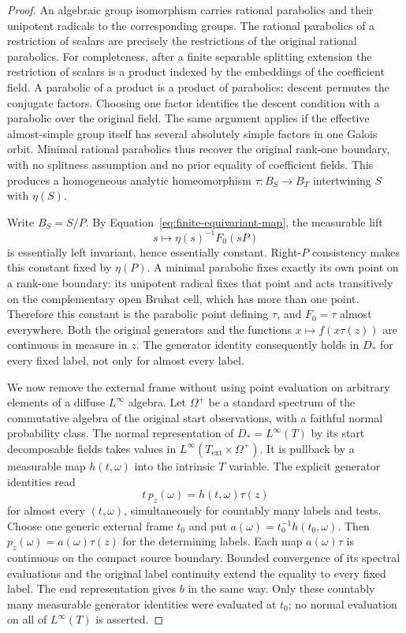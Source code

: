\begin{proof}
An algebraic group isomorphism carries rational parabolics and
their unipotent radicals to the corresponding groups.
The rational parabolics of a restriction of scalars are precisely
the restrictions of the original rational parabolics.
For completeness, after a finite separable splitting extension
the restriction of scalars is a product indexed by the
embeddings of the coefficient field.  A parabolic of a product
is a product of parabolics; descent permutes the conjugate
factors.  Choosing one factor identifies the descent condition
with a parabolic over the original field.  The same argument
applies if the effective almost-simple group itself has several
absolutely simple factors in one Galois orbit.  Minimal rational
parabolics thus recover the original rank-one boundary, with
no splitness assumption and no prior equality of coefficient
fields.  This produces a homogeneous analytic homeomorphism
$\tau:B_S\to B_T$ intertwining $S$ with $\eta(S)$.

Write $B_S=S/P$.  By
Equation~\eqref{eq:finite-equivariant-map}, the measurable lift
\[
 s\longmapsto\eta(s)^{-1}F_0(sP)
\]
is essentially left invariant, hence essentially constant.
Right-$P$ consistency makes this constant fixed by $\eta(P)$.
A minimal parabolic fixes exactly its own point on a rank-one
boundary: its unipotent radical fixes that point and acts
transitively on the complementary open Bruhat cell, which has
more than one point.  Therefore this constant is the parabolic
point defining $\tau$, and $F_0=\tau$ almost everywhere.
Both the original generators and the functions
$x\mapsto f(x\tau(z))$ are continuous in measure in $z$.
The generator identity consequently holds in $D_*$ for every
fixed label, not only for almost every label.

We now remove the external frame without using point evaluation
on arbitrary elements of a diffuse $L^\infty$ algebra.
Let $\Omega^+$ be a standard spectrum of the commutative algebra
of the original start observations, with a faithful normal
probability class.  The normal representation of
$D_*=L^\infty(T)$ by its start decomposable fields takes values
in $L^\infty(T_{\mathrm{ext}}\times\Omega^+)$.
It is pullback by a measurable map $h(t,\omega)$ into the
intrinsic $T$ variable.  The explicit generator identities read
\[
 t\,p_z(\omega)=h(t,\omega)\tau(z)
\]
for almost every $(t,\omega)$, simultaneously for countably
many labels and tests.  Choose one generic external frame $t_0$
and put $a(\omega)=t_0^{-1}h(t_0,\omega)$.
Then $p_z(\omega)=a(\omega)\tau(z)$ for the determining labels.
Each map $a(\omega)\tau$ is continuous on the compact source
boundary.  Bounded convergence of its spectral evaluations and
the original label continuity extend the equality to every
fixed label.  The end representation gives $b$ in the same way.
Only these countably many measurable generator identities were
evaluated at $t_0$; no normal evaluation on all of
$L^\infty(T)$ is asserted.


\end{proof}
